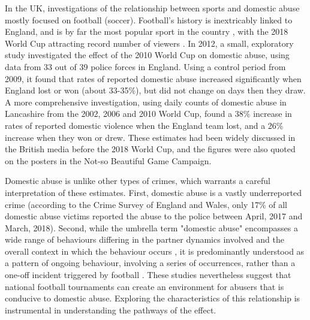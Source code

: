 \documentclass[12pt, letterpaper]{article}
\begin{document}
In the UK, investigations of the relationship between sports and domestic abuse mostly focused on football (soccer). Football's history is inextricably linked to England, and is by far the most popular sport in the country \autocite{Parry2014}, with the 2018 World Cup attracting record number of viewers \autocite{BBC}. In 2012, a small, exploratory study investigated the effect of the 2010 World Cup on domestic abuse, using data from 33 out of 39 police forces in England\autocite{Brimicombe2012}. Using a control period from 2009, it found that rates of reported domestic abuse increased significantly when England lost or won (about 33-35\%), but did not change on days then they draw. A more comprehensive investigation, using daily counts of domestic abuse in Lancashire from the 2002, 2006 and 2010 World Cup, found a 38\% increase in rates of reported domestic violence when the England team lost, and a 26\% increase when they won or drew\autocite{Kirby2014}. These estimates had been widely discussed in the British media before the 2018 World Cup, and the figures were also quoted on the posters in the Not-so Beautiful Game Campaign.  

Domestic abuse is unlike other types of crimes, which warrants a careful interpretation of these estimates. First, domestic abuse is a vastly underreported crime (according to the Crime Survey of England and Wales, only 17\% of all domestic abuse victims reported the abuse to the police between April, 2017 and March, 2018\autocite{ONS}). Second, while the umbrella term "domestic abuse" encompasses a wide range of behaviours differing in the partner dynamics involved and the overall context in which the behaviour occurs \autocite{Kelly2008}, it is predominantly understood as a pattern of ongoing behaviour, involving a series of occurrences, rather than a one-off incident triggered by football \autocite{Brooks-Hay2018}. These studies nevertheless suggest that national football tournaments can create an environment for abusers that is conducive to domestic abuse. Exploring the characteristics of this relationship is instrumental in understanding the pathways of the effect.
\end{document}
